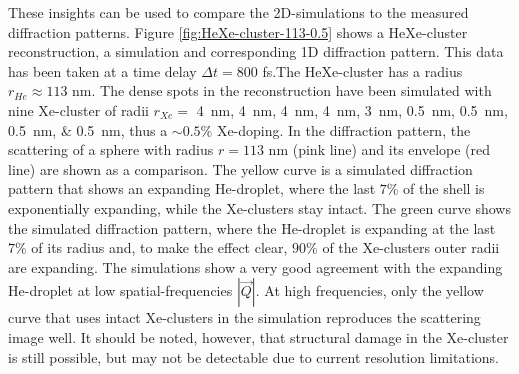 These insights can be used to compare the 2D-simulations to the measured diffraction patterns. Figure \ref{fig:HeXe-cluster-113-0.5} shows a HeXe-cluster reconstruction, a simulation and corresponding 1D diffraction pattern. This data has been taken at a time delay $\Delta t=800$ fs.The HeXe-cluster has a radius $r_{He}\approx 113$ nm. The dense spots in the reconstruction have been simulated with nine Xe-cluster of radii $r_{Xe}=$ \SIlist{4;4;4;4;3;0.5;0.5;0.5;0.5}{\nano\meter}, thus a $\sim 0.5 \%$ Xe-doping. In the diffraction pattern, the scattering of a sphere with radius $r=113$ nm (pink line) and its envelope (red line) are shown as a comparison. The yellow curve is a simulated diffraction pattern that shows an expanding He-droplet, where the last $7 \%$ of the shell is exponentially expanding, while the Xe-clusters stay intact. The green curve shows the simulated diffraction pattern, where the He-droplet is expanding at the last $7 \%$ of its radius and, to make the effect clear, $90 \%$ of the Xe-clusters outer radii are expanding. The simulations show a very good agreement with the expanding He-droplet at low spatial-frequencies $\left|\vec{Q}\right|$. At high frequencies, only the yellow curve that uses intact Xe-clusters in the simulation reproduces the scattering image well. It should be noted, however, that structural damage in the Xe-cluster is still possible, but may not be detectable due to current resolution limitations.
%
%
%
